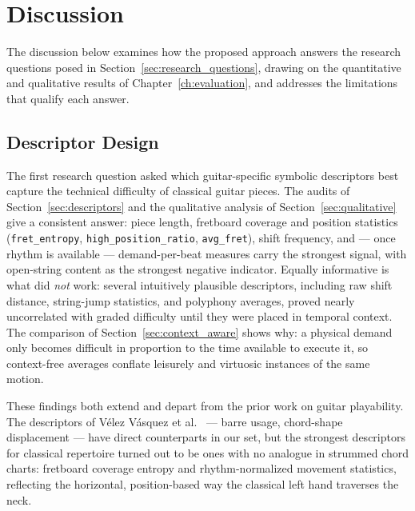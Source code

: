 \chapter{Discussion}
\label{ch:discussion}

The discussion below examines how the proposed approach answers the research questions posed in Section~\ref{sec:research_questions}, drawing on the quantitative and qualitative results of Chapter~\ref{ch:evaluation}, and addresses the limitations that qualify each answer.

\section{Descriptor Design}
\label{sec:disc_descriptors}
The first research question asked which guitar-specific symbolic descriptors best capture the technical difficulty of classical guitar pieces. The audits of Section~\ref{sec:descriptors} and the qualitative analysis of Section~\ref{sec:qualitative} give a consistent answer: piece length, fretboard coverage and position statistics (\texttt{fret\_entropy}, \texttt{high\_position\_ratio}, \texttt{avg\_fret}), shift frequency, and --- once rhythm is available --- demand-per-beat measures carry the strongest signal, with open-string content as the strongest negative indicator. Equally informative is what did \emph{not} work: several intuitively plausible descriptors, including raw shift distance, string-jump statistics, and polyphony averages, proved nearly uncorrelated with graded difficulty until they were placed in temporal context. The comparison of Section~\ref{sec:context_aware} shows why: a physical demand only becomes difficult in proportion to the time available to execute it, so context-free averages conflate leisurely and virtuosic instances of the same motion.

These findings both extend and depart from the prior work on guitar playability. The descriptors of V{\'e}lez V{\'a}squez et al.~\cite{vasquez2023quantifying} --- barre usage, chord-shape displacement --- have direct counterparts in our set, but the strongest descriptors for classical repertoire turned out to be ones with no analogue in strummed chord charts: fretboard coverage entropy and rhythm-normalized movement statistics, reflecting the horizontal, position-based way the classical left hand traverses the neck.

